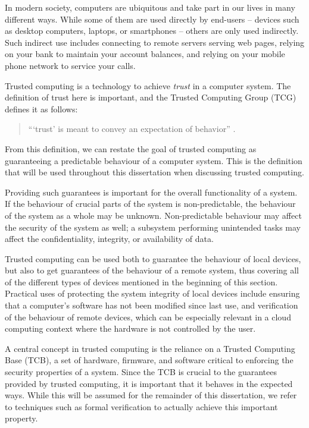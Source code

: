 In modern society, computers are ubiquitous and take part in our lives in many different ways.
While some of them are used directly by end-users -- devices such as desktop computers, laptops, or smartphones -- others are only used indirectly.
Such indirect use includes connecting to remote servers serving web pages, relying on your bank to maintain your account balances, and relying on your mobile phone network to service your calls.

Trusted computing is a technology to achieve \emph{trust} in a computer system.
The definition of trust here is important, and the Trusted Computing Group (TCG) defines it as follows:
\begin{quote}
```trust'  is  meant  to  convey  an  expectation  of  behavior'' \cite{TPM2.0r38}.
\end{quote}  
From this definition, we can restate the goal of trusted computing as guaranteeing a predictable behaviour of a computer system.
This is the definition that will be used throughout this dissertation when discussing trusted computing.

Providing such guarantees is important for the overall functionality of a system.
If the behaviour of crucial parts of the system is non-predictable, the behaviour of the system as a whole may be unknown.
Non-predictable behaviour may affect the security of the system as well; a subsystem performing unintended tasks may affect the confidentiality, integrity, or availability of data.

Trusted computing can be used both to guarantee the behaviour of local devices, but also to get guarantees of the behaviour of a remote system, thus covering all of the different types of devices mentioned in the beginning of this section.
Practical uses of protecting the system integrity of local devices include ensuring that a computer's software has not been modified since last use, and verification of the behaviour of remote devices, which can be especially relevant in a cloud computing context where the hardware is not controlled by the user.

A central concept in trusted computing is the reliance on a Trusted Computing Base (TCB), a set of hardware, firmware, and software critical to enforcing the security properties of a system.
Since the TCB is crucial to the guarantees provided by trusted computing, it is important that it behaves in the expected ways.
While this will be assumed for the remainder of this dissertation, we refer to techniques such as formal verification \cite{dsilva:2008,klein:2009,kern:1999} to actually achieve this important property.

